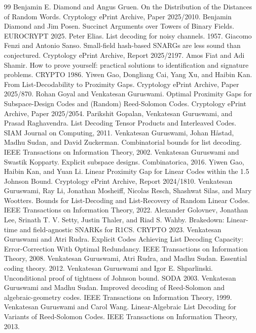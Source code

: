 \documentclass[11pt]{article}
\theoremstyle{plain}
\theoremstyle{definition}
\begin{document}
\begin{thebibliography}{99}
 Benjamin E. Diamond and Angus Gruen. On the Distribution of the Distances of Random Words. Cryptology ePrint Archive, Paper 2025/2010.
 Benjamin Diamond and Jim Posen. Succinct Arguments over Towers of Binary Fields. EUROCRYPT 2025.
 Peter Elias. List decoding for noisy channels. 1957.
 Giacomo Fenzi and Antonio Sanso. Small-field hash-based SNARGs are less sound than conjectured. Cryptology ePrint Archive, Report 2025/2197.
 Amos Fiat and Adi Shamir. How to prove yourself: practical solutions to identification and signature problems. CRYPTO 1986.
 Yiwen Gao, Dongliang Cai, Yang Xu, and Haibin Kan. From List-Decodability to Proximity Gaps. Cryptology ePrint Archive, Paper 2025/870.
 Rohan Goyal and Venkatesan Guruswami. Optimal Proximity Gaps for Subspace-Design Codes and (Random) Reed-Solomon Codes. Cryptology ePrint Archive, Paper 2025/2054.
 Parikshit Gopalan, Venkatesan Guruswami, and Prasad Raghavendra. List Decoding Tensor Products and Interleaved Codes. SIAM Journal on Computing, 2011.
 Venkatesan Guruswami, Johan H\aa{}stad, Madhu Sudan, and David Zuckerman. Combinatorial bounds for list decoding. IEEE Transactions on Information Theory, 2002.
 Venkatesan Guruswami and Swastik Kopparty. Explicit subspace designs. Combinatorica, 2016.
 Yiwen Gao, Haibin Kan, and Yuan Li. Linear Proximity Gap for Linear Codes within the 1.5 Johnson Bound. Cryptology ePrint Archive, Report 2024/1810.
 Venkatesan Guruswami, Ray Li, Jonathan Mosheiff, Nicolas Resch, Shashwat Silas, and Mary Wootters. Bounds for List-Decoding and List-Recovery of Random Linear Codes. IEEE Transactions on Information Theory, 2022.
 Alexander Golovnev, Jonathan Lee, Srinath T. V. Setty, Justin Thaler, and Riad S. Wahby. Brakedown: Linear-time and field-agnostic SNARKs for R1CS. CRYPTO 2023.
 Venkatesan Guruswami and Atri Rudra. Explicit Codes Achieving List Decoding Capacity: Error-Correction With Optimal Redundancy. IEEE Transactions on Information Theory, 2008.
 Venkatesan Guruswami, Atri Rudra, and Madhu Sudan. Essential coding theory. 2012.
 Venkatesan Guruswami and Igor E. Shparlinski. Unconditional proof of tightness of Johnson bound. SODA 2003.
 Venkatesan Guruswami and Madhu Sudan. Improved decoding of Reed-Solomon and algebraic-geometry codes. IEEE Transactions on Information Theory, 1999.
 Venkatesan Guruswami and Carol Wang. Linear-Algebraic List Decoding for Variants of Reed-Solomon Codes. IEEE Transactions on Information Theory, 2013.

\end{thebibliography}
\end{document}
